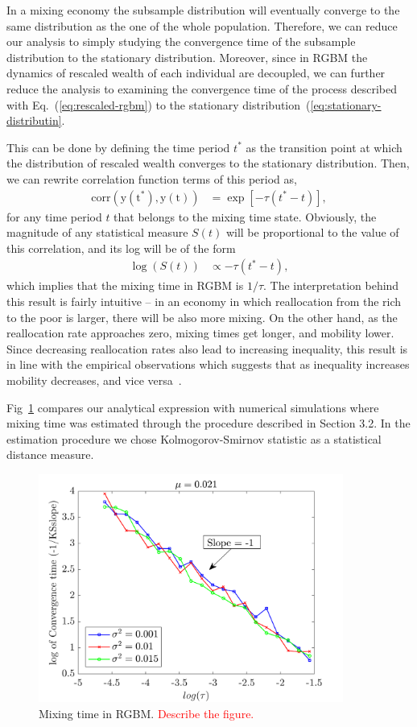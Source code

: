 \documentclass[11pt]{article}
\numberwithin{equation}{section}
\begin{document}
In a mixing economy the subsample distribution will eventually converge to the same distribution as the one of the whole population. Therefore, we can reduce our analysis to simply studying the convergence time of the subsample distribution to the stationary distribution. Moreover, since in RGBM the dynamics of rescaled wealth of each individual are decoupled, we can further reduce the analysis to examining the convergence time of the process described with Eq.~(\ref{eq:rescaled-rgbm}) to the stationary distribution~(\ref{eq:stationary-distributin}.

This can be done by defining the time period $t^*$ as the transition point at which the distribution of rescaled wealth converges to the stationary distribution. Then, we can rewrite correlation function terms of this period as,
\begin{align*}
    \mathrm{corr(y(t^*), y(t))} &= \exp\left[ -\tau (t^* -t)\right],
\end{align*}
for any time period $t$ that belongs to the mixing time state. Obviously, the magnitude of any statistical measure $S(t)$ will be proportional to the value of this correlation, and its log will be of the form
\begin{align}
    \log (S(t)) &\propto  - \tau (t^*-t),
\end{align}
which implies that the mixing time in RGBM is $1/\tau$. The interpretation behind this result is fairly intuitive -- in an economy in which reallocation from the rich to the poor is larger, there will be also more mixing. On the other  hand, as the reallocation rate approaches zero, mixing times get longer, and mobility lower. Since decreasing reallocation rates also lead to increasing inequality, this result is in line with the empirical observations which suggests that as inequality increases mobility decreases, and vice versa~\citep{corak2013}.

Fig~\ref{fig:rgbm-mixing-time} compares our analytical expression with numerical simulations where mixing time was estimated through the procedure described in Section 3.2. In the estimation procedure we chose Kolmogorov-Smirnov statistic as a statistical distance measure.
\begin{figure}[t!]
\includegraphics[width=10cm]{figs/fig_mixing_time_rgbm.png}
\caption{Mixing time in RGBM. \textcolor{red}{Describe the figure.}\label{fig:rgbm-mixing-time}}
\end{figure}
\end{document}
